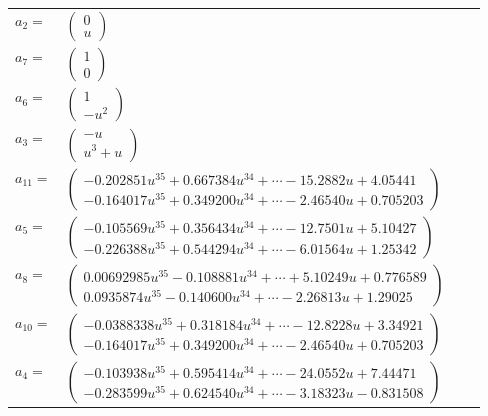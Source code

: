 \documentclass[1p]{elsarticle_modified}
\theoremstyle{definition}
\begin{document}
\begin{tabular}{m{7pt} m{180pt} m{7pt} m{180pt} }
\flushright $a_{2}=$&$\begin{pmatrix}0\\u\end{pmatrix}$ \\
\flushright $a_{7}=$&$\begin{pmatrix}1\\0\end{pmatrix}$ \\
\flushright $a_{6}=$&$\begin{pmatrix}1\\- u^2\end{pmatrix}$ \\
\flushright $a_{3}=$&$\begin{pmatrix}- u\\u^3+u\end{pmatrix}$ \\
\flushright $a_{11}=$&$\begin{pmatrix}-0.202851 u^{35}+0.667384 u^{34}+\cdots-15.2882 u+4.05441\\-0.164017 u^{35}+0.349200 u^{34}+\cdots-2.46540 u+0.705203\end{pmatrix}$ \\
\flushright $a_{5}=$&$\begin{pmatrix}-0.105569 u^{35}+0.356434 u^{34}+\cdots-12.7501 u+5.10427\\-0.226388 u^{35}+0.544294 u^{34}+\cdots-6.01564 u+1.25342\end{pmatrix}$ \\
\flushright $a_{8}=$&$\begin{pmatrix}0.00692985 u^{35}-0.108881 u^{34}+\cdots+5.10249 u+0.776589\\0.0935874 u^{35}-0.140600 u^{34}+\cdots-2.26813 u+1.29025\end{pmatrix}$ \\
\flushright $a_{10}=$&$\begin{pmatrix}-0.0388338 u^{35}+0.318184 u^{34}+\cdots-12.8228 u+3.34921\\-0.164017 u^{35}+0.349200 u^{34}+\cdots-2.46540 u+0.705203\end{pmatrix}$ \\
\flushright $a_{4}=$&$\begin{pmatrix}-0.103938 u^{35}+0.595414 u^{34}+\cdots-24.0552 u+7.44471\\-0.283599 u^{35}+0.624540 u^{34}+\cdots-3.18323 u-0.831508\end{pmatrix}$ \\

\end{tabular}
\end{document}
